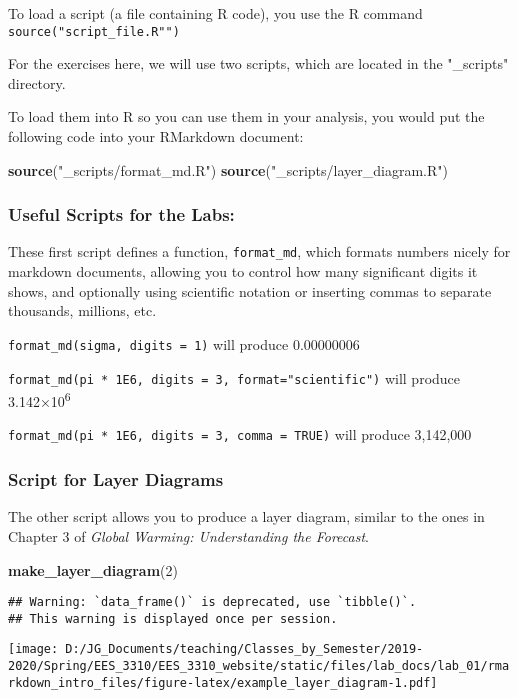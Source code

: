 \documentclass[
]{article}
\newenvironment{Shaded}{\begin{snugshade}}{\end{snugshade}}
\newcommand{\DecValTok}[1]{\textcolor[rgb]{0.00,0.00,0.81}{#1}}
\newcommand{\KeywordTok}[1]{\textcolor[rgb]{0.13,0.29,0.53}{\textbf{#1}}}
\newcommand{\NormalTok}[1]{#1}
\newcommand{\StringTok}[1]{\textcolor[rgb]{0.31,0.60,0.02}{#1}}
\begin{document}
To load a script (a file containing R code), you use the R command
\texttt{source("script\_file.R"")}

For the exercises here, we will use two scripts, which are located in
the "\_scripts" directory.

To load them into R so you can use them in your analysis, you would put
the following code into your RMarkdown document:

\begin{Shaded}
\begin{Highlighting}[]
\KeywordTok{source}\NormalTok{(}\StringTok{"_scripts/format_md.R"}\NormalTok{)}
\KeywordTok{source}\NormalTok{(}\StringTok{"_scripts/layer_diagram.R"}\NormalTok{)}
\end{Highlighting}
\end{Shaded}

\hypertarget{useful-scripts-for-the-labs}{%
\subsubsection{Useful Scripts for the
Labs:}\label{useful-scripts-for-the-labs}}

These first script defines a function, \texttt{format\_md}, which
formats numbers nicely for markdown documents, allowing you to control
how many significant digits it shows, and optionally using scientific
notation or inserting commas to separate thousands, millions, etc.

\texttt{format\_md(sigma,\ digits\ =\ 1)} will produce 0.00000006

\texttt{format\_md(pi\ *\ 1E6,\ digits\ =\ 3,\ format="scientific")}
will produce 3.142×10\textsuperscript{6}

\texttt{format\_md(pi\ *\ 1E6,\ digits\ =\ 3,\ comma\ =\ TRUE)} will
produce 3,142,000

\hypertarget{script-for-layer-diagrams}{%
\subsubsection{Script for Layer
Diagrams}\label{script-for-layer-diagrams}}

The other script allows you to produce a layer diagram, similar to the
ones in Chapter 3 of \emph{Global Warming: Understanding the Forecast}.

\begin{Shaded}
\begin{Highlighting}[]
\KeywordTok{make_layer_diagram}\NormalTok{(}\DecValTok{2}\NormalTok{)}
\end{Highlighting}
\end{Shaded}

\begin{verbatim}
## Warning: `data_frame()` is deprecated, use `tibble()`.
## This warning is displayed once per session.
\end{verbatim}

\texttt{[image: D:/JG\_Documents/teaching/Classes\_by\_Semester/2019-2020/Spring/EES\_3310/EES\_3310\_website/static/files/lab\_docs/lab\_01/rmarkdown\_intro\_files/figure-latex/example\_layer\_diagram-1.pdf]}
\end{document}
